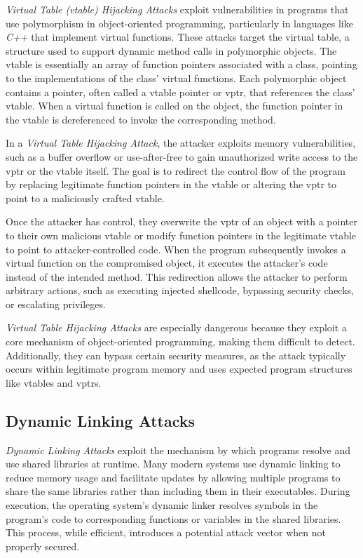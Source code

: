 \textit{Virtual Table (vtable) Hijacking Attacks} exploit vulnerabilities in programs
that use polymorphism in object-oriented programming, particularly in languages
like \textit{C++} that implement virtual functions. These attacks target the
virtual table, a structure used to support dynamic method calls in polymorphic objects.
The vtable is essentially an array of function pointers associated with a class,
pointing to the implementations of the class' virtual functions. Each polymorphic
object contains a pointer, often called a vtable pointer or vptr, that references
the class' vtable. When a virtual function is called on the object, the function
pointer in the vtable is dereferenced to invoke the corresponding method.

In a \textit{Virtual Table Hijacking Attack}, the attacker exploits memory
vulnerabilities, such as a buffer overflow or use-after-free to gain unauthorized
write access to the vptr or the vtable itself. The goal is to redirect the
control flow of the program by replacing legitimate function pointers in the
vtable or altering the vptr to point to a maliciously crafted vtable.

Once the attacker has control, they overwrite the vptr of an object with a pointer
to their own malicious vtable or modify function pointers in the legitimate vtable
to point to attacker-controlled code. When the program subsequently invokes a
virtual function on the compromised object, it executes the attacker's code instead
of the intended method. This redirection allows the attacker to perform
arbitrary actions, such as executing injected shellcode, bypassing security
checks, or escalating privileges.

\textit{Virtual Table Hijacking Attacks} are especially dangerous because they
exploit a core mechanism of object-oriented programming, making them difficult to
detect. Additionally, they can bypass certain security measures, as the attack
typically occurs within legitimate program memory and uses expected program
structures like vtables and vptrs.

\subsection{Dynamic Linking Attacks}
\label{subsec:background_dynamiclinking}

\textit{Dynamic Linking Attacks} exploit the mechanism by which programs resolve
and use shared libraries at runtime. Many modern systems use dynamic linking to reduce
memory usage and facilitate updates by allowing multiple programs to share the same
libraries rather than including them in their executables. During execution, the
operating system's dynamic linker resolves symbols in the program's code to corresponding
functions or variables in the shared libraries. This process, while efficient,
introduces a potential attack vector when not properly secured.

